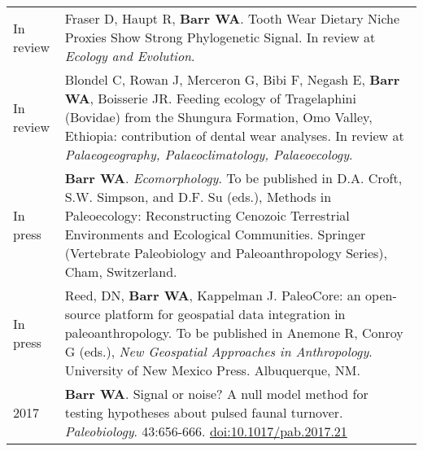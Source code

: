 \documentclass{article}
\begin{document}
\begin{longtable}{p{}p{}}

 In review & Fraser D, Haupt R,  {\bfseries Barr WA}. Tooth Wear Dietary Niche Proxies Show Strong Phylogenetic Signal.  In review at \emph{Ecology and Evolution}.\\[4pt]



In review & Blondel C, Rowan J, Merceron G, Bibi F,  Negash E, {\bfseries Barr WA}, Boisserie JR. Feeding ecology of Tragelaphini (Bovidae) from the Shungura Formation, Omo Valley, Ethiopia: contribution of dental wear analyses. In review at \emph{Palaeogeography, Palaeoclimatology, Palaeoecology}.\\[4pt]


In press & {\bfseries Barr WA}. \emph{Ecomorphology}. To be published in D.A. Croft, S.W. Simpson, and D.F. Su (eds.), Methods in Paleoecology: Reconstructing Cenozoic Terrestrial Environments and Ecological Communities. Springer (Vertebrate Paleobiology and Paleoanthropology Series), Cham, Switzerland.\\[4pt]

In press & Reed, DN, {\bfseries Barr WA}, Kappelman J. PaleoCore: an open-source platform for geospatial data integration in paleoanthropology. To be published in Anemone R, Conroy G (eds.), \emph{New Geospatial Approaches in Anthropology}. University of New Mexico Press. Albuquerque, NM.\\[4pt]


2017 & {\bfseries Barr WA}. Signal or noise? A null model method for testing hypotheses about pulsed faunal turnover. \emph{Paleobiology}. 43:656-666. \href{https://doi.org/10.1017/pab.2017.21}{doi:10.1017/pab.2017.21}\\[4pt]


\end{longtable}
\end{document}
